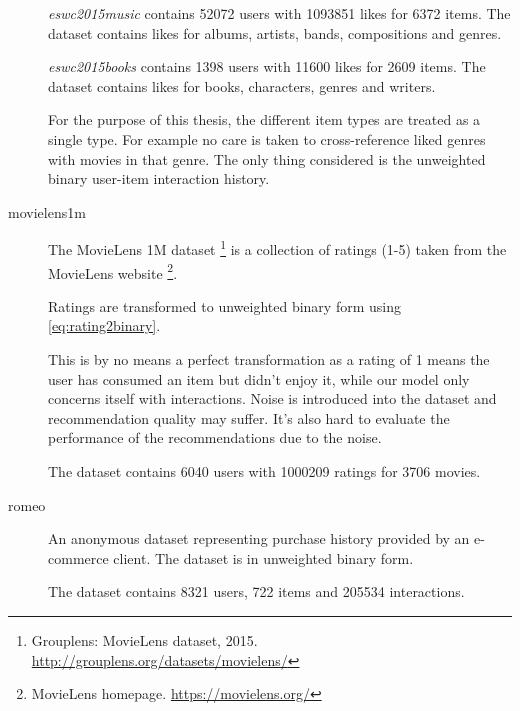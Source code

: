 \begin{description}
        \textit{eswc2015music} contains 52072 users with 1093851 likes for 6372 items. The dataset contains likes for albums, artists, bands, compositions and genres.

        \textit{eswc2015books} contains 1398 users with 11600 likes for 2609 items. The dataset contains likes for books, characters, genres and writers.

        For the purpose of this thesis, the different item types are treated as a single type. For example no care is taken to cross-reference liked genres with movies in that genre. The only thing considered is the unweighted binary user-item interaction history.





    \item[movielens1m] \hfill

        The MovieLens 1M dataset \footnote{Grouplens: MovieLens dataset, 2015. \url{http://grouplens.org/datasets/movielens/}} is a collection of ratings (1-5) taken from the MovieLens website \footnote{MovieLens homepage. \url{https://movielens.org/}}.

        Ratings are transformed to unweighted binary form using \eqref{eq:rating2binary}.

        This is by no means a perfect transformation as a rating of 1 means the user has consumed an item but didn't enjoy it, while our model only concerns itself with interactions. Noise is introduced into the dataset and recommendation quality may suffer. It's also hard to evaluate the performance of the recommendations due to the noise.

        The dataset contains 6040 users with 1000209 ratings for 3706 movies.



    \item[romeo] \hfill

        An anonymous dataset representing purchase history provided by an e-commerce client. The dataset is in unweighted binary form.

        The dataset contains 8321 users, 722 items and 205534 interactions.



\end{description}

